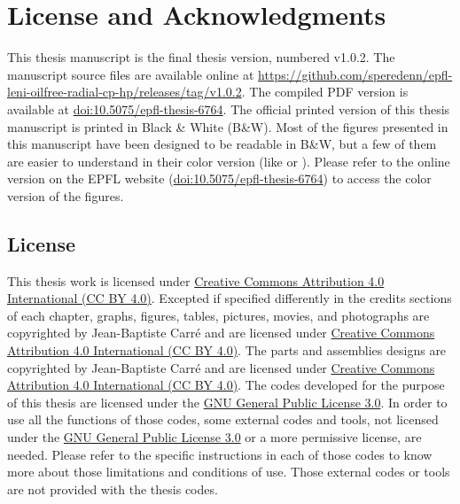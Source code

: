 \chapter{License and Acknowledgments}
\label{chap:licenses}

This thesis manuscript is the final thesis version, numbered
v1.0.2. The manuscript source files are available online at
\href{https://github.com/speredenn/epfl-leni-oilfree-radial-cp-hp/releases/tag/v1.0.2}{https://github.com/speredenn/epfl-leni-oilfree-radial-cp-hp/releases/tag/v1.0.2}. The
compiled PDF version is available at
\href{http://dx.doi.org/10.5075/epfl-thesis-6764}{doi:10.5075/epfl-thesis-6764}. The
official printed version of this thesis manuscript is printed in Black
\& White (B\&W). Most of the figures presented in this manuscript have
been designed to be readable in B\&W, but a few of them are easier to
understand in their color version (like
 or
). Please refer to the
online version on the EPFL website
(\href{http://dx.doi.org/10.5075/epfl-thesis-6764}{doi:10.5075/epfl-thesis-6764})
to access the color version of the figures.

\section*{License}
\label{sec:licenses}

This thesis work is licensed under
\href{http://creativecommons.org/licenses/by/4.0/}{Creative Commons
  Attribution 4.0 International (CC BY
  4.0)}. Excepted
if specified differently in the credits sections of each chapter,
graphs, figures, tables, pictures, movies, and photographs are
copyrighted by Jean-Baptiste Carré and are licensed under
\href{http://creativecommons.org/licenses/by/4.0/}{Creative Commons
  Attribution 4.0 International (CC BY 4.0)}. The parts and assemblies
designs are copyrighted by Jean-Baptiste Carré and are licensed under
\href{http://creativecommons.org/licenses/by/4.0/}{Creative Commons
  Attribution 4.0 International (CC BY 4.0)}. The codes developed for
the purpose of this thesis are licensed under the
\href{http://www.gnu.org/licenses/gpl.html}{GNU General Public License
  3.0}. In order to
use all the functions of those codes, some external codes and tools,
not licensed under the \href{http://www.gnu.org/licenses/gpl.html}{GNU
  General Public License 3.0} or a more permissive license, are
needed. Please refer to the specific instructions in each of those
codes to know more about those limitations and conditions of
use. Those external codes or tools are not provided with the thesis
codes.

